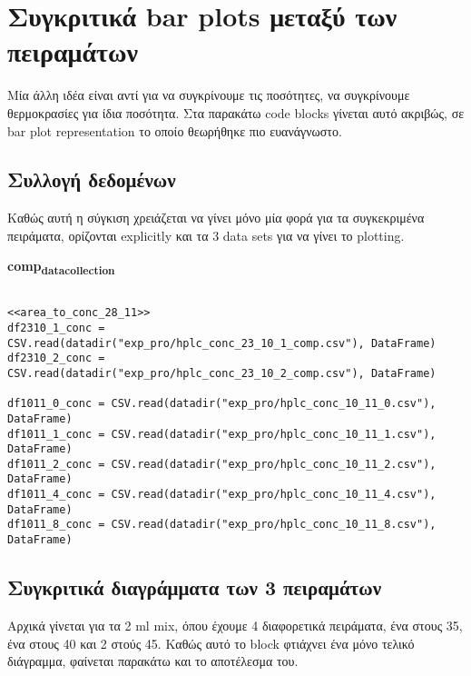 \documentclass[11pt]{article}
\begin{document}
\section{Συγκριτικά bar plots μεταξύ των πειραμάτων}
\label{sec:org30e258b}
Μία άλλη ιδέα είναι αντί για να συγκρίνουμε τις ποσότητες, να συγκρίνουμε θερμοκρασίες για ίδια ποσότητα. Στα παρακάτω code blocks γίνεται αυτό ακριβώς, σε bar plot representation το οποίο θεωρήθηκε πιο ευανάγνωστο. 
\subsection{Συλλογή δεδομένων}
\label{sec:org81e70ad}
Καθώς αυτή η σύγκιση χρειάζεται να γίνει μόνο μία φορά για τα συγκεκριμένα πειράματα, ορίζονται explicitly και τα 3 data sets για να γίνει το plotting.

\textbf{comp\textsubscript{data}\textsubscript{collection}}
\begin{verbatim}

<<area_to_conc_28_11>>
df2310_1_conc = CSV.read(datadir("exp_pro/hplc_conc_23_10_1_comp.csv"), DataFrame)
df2310_2_conc = CSV.read(datadir("exp_pro/hplc_conc_23_10_2_comp.csv"), DataFrame)

df1011_0_conc = CSV.read(datadir("exp_pro/hplc_conc_10_11_0.csv"), DataFrame)
df1011_1_conc = CSV.read(datadir("exp_pro/hplc_conc_10_11_1.csv"), DataFrame)
df1011_2_conc = CSV.read(datadir("exp_pro/hplc_conc_10_11_2.csv"), DataFrame)
df1011_4_conc = CSV.read(datadir("exp_pro/hplc_conc_10_11_4.csv"), DataFrame)
df1011_8_conc = CSV.read(datadir("exp_pro/hplc_conc_10_11_8.csv"), DataFrame)

\end{verbatim}

\subsection{Συγκριτικά διαγράμματα των 3 πειραμάτων}
\label{sec:orgc8fc742}
Αρχικά γίνεται για τα 2 ml mix, όπου έχουμε 4 διαφορετικά πειράματα, ένα στους 35, ένα στους 40 και 2 στούς 45. Καθώς αυτό το block φτιάχνει ένα μόνο τελικό διάγραμμα, φαίνεται παρακάτω και το αποτέλεσμα του.
\end{document}
